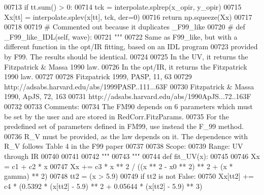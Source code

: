 \begin{DoxyVerb}
\begin{DoxyCode}
00713         \textcolor{keywordflow}{if} tt.sum() > 0:
00714             tck = interpolate.splrep(x\_opir, y\_opir)
00715             Xx[tt] = interpolate.splev(x[tt], tck, der=0)
00716         \textcolor{keywordflow}{return} np.squeeze(Xx)
00717 
00718 
00719 \textcolor{comment}{# Commented out because it duplicates \_F99\_like}
00720 \textcolor{comment}{#    def \_F99\_like\_IDL(self, wave):}
00721         \textcolor{stringliteral}{"""}
00722 \textcolor{stringliteral}{        Same as F99\_like, but with a different function in the opt/IR fitting, based on an IDL program}
00723 \textcolor{stringliteral}{        provided by F99. The results should be identical.}
00724 \textcolor{stringliteral}{    }
00725 \textcolor{stringliteral}{        In the UV, it returns the Fitzpatrick & Massa 1990 law.}
00726 \textcolor{stringliteral}{        In the opt/IR, it returns the Fitzpatrick 1990 law. }
00727 \textcolor{stringliteral}{        }
00728 \textcolor{stringliteral}{        Fitzpatrick 1999, PASP, 11, 63}
00729 \textcolor{stringliteral}{        http://adsabs.harvard.edu/abs/1999PASP..111...63F}
00730 \textcolor{stringliteral}{        Fitzpatrick & Massa 1990, ApJS, 72, 163}
00731 \textcolor{stringliteral}{        http://adsabs.harvard.edu/abs/1990ApJS...72..163F}
00732 \textcolor{stringliteral}{        }
00733 \textcolor{stringliteral}{        Comments:}
00734 \textcolor{stringliteral}{        The FM90 depends on 6 parameters which must be set by the user and are stored in
       RedCorr.FitzParams.}
00735 \textcolor{stringliteral}{        For the predefined set of parameters defined in FM99, use instead the F\_99 method.}
00736 \textcolor{stringliteral}{        R\_V must be provided, as the law depends on it. The dependence with R\_V follows Table 4 in the F99
       paper }
00737 \textcolor{stringliteral}{}
00738 \textcolor{stringliteral}{        Scope:    }
00739 \textcolor{stringliteral}{        Range: UV through IR}
00740 \textcolor{stringliteral}{        }
00741 \textcolor{stringliteral}{        }
00742 \textcolor{stringliteral}{        """}
00743         \textcolor{stringliteral}{"""}
00744 \textcolor{stringliteral}{        def fit\_UV(x):}
00745 \textcolor{stringliteral}{}
00746 \textcolor{stringliteral}{            Xx = c1 + c2 * x}
00747 \textcolor{stringliteral}{            Xx += c3 * x ** 2 / ((x ** 2 - x0 ** 2) ** 2 + (x * gamma) ** 2)}
00748 \textcolor{stringliteral}{            tt2 = (x > 5.9) }
00749 \textcolor{stringliteral}{            if tt2 is not False:}
00750 \textcolor{stringliteral}{                Xx[tt2] += c4 * (0.5392 * (x[tt2] - 5.9) ** 2 + 0.05644 * (x[tt2] - 5.9) ** 3)}

\end{DoxyCode}
\end{DoxyVerb}
